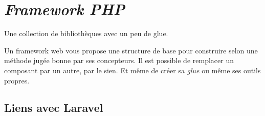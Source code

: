 \begin{otherlanguage}{english}

\begin{Shaded}
\begin{Highlighting}[]
 

\OtherTok{(}\OtherTok{[}\OtherTok{])}\NormalTok{ \{}
    \OtherTok{:}
    \OtherTok{:}
        \OtherTok{;}
    \OtherTok{:}
        \NormalTok{ \{}
             \OtherTok{(}
                \OtherTok{[}\OtherTok{],}
                \OtherTok{[}\OtherTok{]}
            \OtherTok{);}
\NormalTok{        \} } \OtherTok{(} \OtherTok{)}\NormalTok{\{}
            \OtherTok{(}\OtherTok{);}
\NormalTok{        \}}
        \OtherTok{;}
\NormalTok{\}}
\end{Highlighting}
\end{Shaded}

\end{otherlanguage}

\hypertarget{framework-php}{%
\section{\texorpdfstring{\emph{Framework
PHP}}{Framework PHP}}\label{framework-php}}

Une collection de bibliothèques avec un peu de glue.

Un framework web vous propose une structure de base pour construire
selon une méthode jugée bonne par ses concepteurs. Il est possible de
remplacer un composant par un autre, par le sien. Et même de créer sa
\emph{glue} ou même ses outils propres.

\hypertarget{liens-avec-laravel}{%
\subsection{Liens avec Laravel}\label{liens-avec-laravel}}

